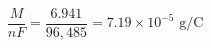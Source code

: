 \documentclass[preview]{standalone}
\begin{document}
\[\frac{M}{nF} = \frac{6.941}{96{,}485} = 7.19 \times 10^{-5} \text{ g/C}\]
\end{document}
